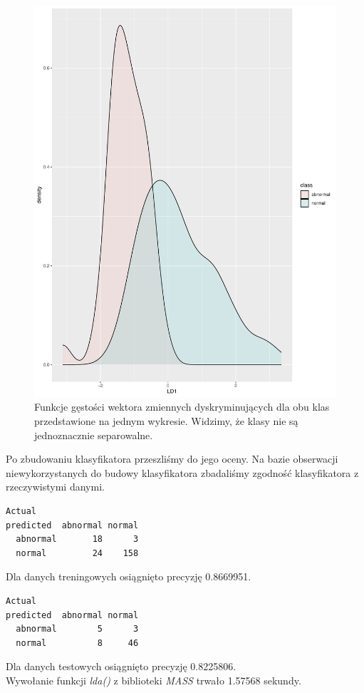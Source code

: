 \documentclass[10pt,a4paper]{article}
\begin{document}
\begin{figure}[H]
\includegraphics[scale=0.5]{density.pdf}
\caption{Funkcje gęstości wektora zmiennych dyskryminujących dla obu klas przedstawione na jednym wykresie. Widzimy, że klasy nie są jednoznacznie separowalne.}
\end{figure}

Po zbudowaniu klasyfikatora przeszliśmy do jego oceny. Na bazie obserwacji niewykorzystanych do budowy klasyfikatora zbadaliśmy zgodność klasyfikatora z rzeczywistymi danymi. 

\begin{lstlisting}[caption={Macierz pomyłek dla danych treningowych}]
          Actual
predicted  abnormal normal
  abnormal       18      3
  normal         24    158
\end{lstlisting}
Dla danych treningowych osiągnięto precyzję 0.8669951.

\begin{lstlisting}[caption={Macierz pomyłek dla danych testowych}]
          Actual
predicted  abnormal normal
  abnormal        5      3
  normal          8     46
\end{lstlisting}
Dla danych testowych osiągnięto precyzję 0.8225806.
\\
Wywołanie funkcji \textit{lda()} z biblioteki \textit{MASS} trwało 1.57568 sekundy.
\end{document}

